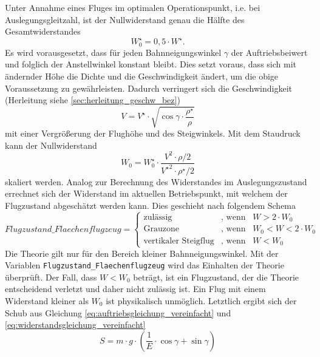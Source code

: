 Unter Annahme eines Fluges im optimalen Operationspunkt, i.e. bei Auslegungsgleitzahl, ist der Nullwiderstand genau die Hälfte des Gesamtwiderstandes \cite[S.82-S.83]{Bruning.1986}
\begin{equation}
	W_0^\star = 0,5\cdot W^\star .
\end{equation}
Es wird vorausgesetzt, dass für jeden Bahnneigungswinkel \ensuremath{\gamma} der Auftriebsbeiwert und folglich der Anstellwinkel konstant bleibt. Dies setzt voraus, dass sich mit ändernder Höhe die Dichte und die Geschwindigkeit ändert, um die obige Voraussetzung zu gewährleisten. Dadurch verringert sich die Geschwindigkeit (Herleitung siehe \ref{sec:herleitung_geschw_bez})
\begin{equation}
	V = V^\star\cdot\sqrt{\cos\gamma\cdot\frac{\rho^\star}{\rho}}  \label{eq:geschw_flaechenflugzeug}
\end{equation}
mit einer Vergrößerung der Flughöhe und des Steigwinkels. Mit dem Staudruck kann der Nullwiderstand 
\begin{equation}
	W_0 = W_0^\star\cdot\frac{V^2\cdot\rho/2}{{V^\star}^2\cdot\rho^\star/2}
\end{equation}
skaliert werden.
Analog zur Berechnung des Widerstandes im Auslegungszustand errechnet sich der Widerstand im aktuellen Betriebspunkt, mit welchem der Flugzustand abgeschätzt werden kann. Dies geschieht nach folgendem Schema
\begin{equation}
Flugzustand\_Flaechenflugzeug = \begin{cases} 
\text{zulässig} & \text{, wenn} \;\;\; W > 2\cdot W_0 \\ 
\text{Grauzone} & \text{, wenn} \;\;\; W_0 < W < 2\cdot W_0 \\ 
\text{vertikaler Steigflug}  & \text{, wenn} \;\;\; W < W_0 
\end{cases}
\end{equation} 
Die Theorie gilt nur für den Bereich kleiner Bahnneigungswinkel. Mit der Variablen \texttt{Flugzustand\_Flaechenflugzeug} wird das Einhalten der Theorie überprüft. Der Fall, dass \ensuremath{W < W_0} beträgt, ist ein Flugzustand, der die Theorie entscheidend verletzt und daher nicht zulässig ist. Ein Flug mit einem Widerstand kleiner als \ensuremath{W_0} ist physikalisch unmöglich.
Letztlich ergibt sich der Schub aus Gleichung \ref{eq:auftriebsgleichung_vereinfacht} und \ref{eq:widerstandsgleichung_vereinfacht}
\begin{equation}
	S = m\cdot g\cdot (\frac{1}{E}\cdot\cos\gamma + \sin\gamma) \label{eq:schub_flaechenflugzeug}
\end{equation}
